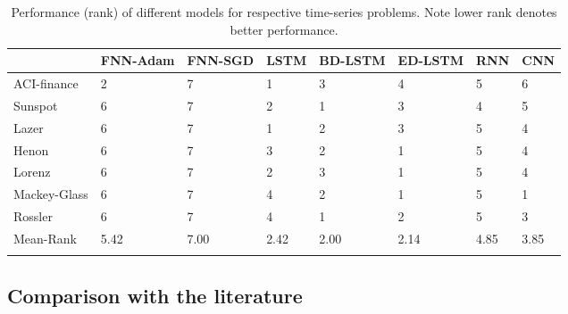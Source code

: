 \documentclass[final,5p,times,twocolumn]{elsarticle}
\begin{document}
 
\begin{table*}[htbp!]
 \small 
 \centering
\begin{tabular}{llllllll}
\hline
 &  FNN-Adam& FNN-SGD & LSTM & BD-LSTM  & ED-LSTM & RNN & CNN\\
\hline
\hline
ACI-finance  &      
2&7&1&3&4&5&6\\
Sunspot &      
6&7&2&1&3&4&5\\
Lazer &      
6&7&1&2&3&5&4\\
Henon &      
6&7&3&2&1&5&4\\
Lorenz &      
6&7&2&3&1&5&4\\
Mackey-Glass &      
6&7&4&2&1&5&1\\
Rossler &      
6&7&4&1&2&5&3\\
\hline
Mean-Rank & 5.42 & 7.00  & 2.42  & 2.00  & 2.14  & 4.85  & 3.85 \\

\hline &
\end{tabular}
\caption{Performance (rank) of different models for respective  time-series problems. Note lower rank denotes better performance. }
\label{tab:resultranks}
\end{table*}

 
 

 \subsection{Comparison with the literature}
  
 
 
\end{document}
